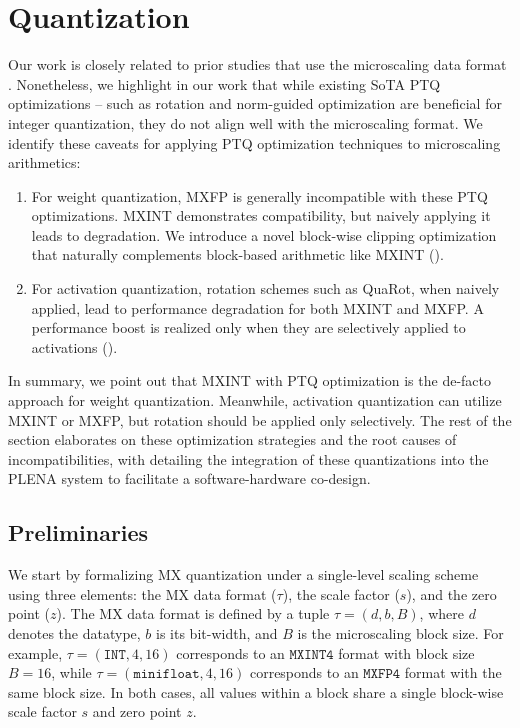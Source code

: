 \section{Quantization}
\label{sec:quantization}

Our work is closely related to prior studies that use the microscaling data format \cite{microscaling, Microscopiq}. Nonetheless, we highlight in our work that while existing SoTA PTQ optimizations -- such as rotation \cite{QuaRot} and norm-guided optimization \cite{frantar2022gptq} are beneficial for integer quantization, they do not align well with the microscaling format.
We identify these caveats for applying PTQ optimization techniques to microscaling arithmetics:

\begin{enumerate}
    \item For weight quantization, MXFP is generally incompatible with these PTQ optimizations. MXINT demonstrates compatibility, but naively applying it leads to degradation. We introduce a novel block-wise clipping optimization that naturally complements block-based arithmetic like MXINT ().
    \item For activation quantization, rotation schemes such as QuaRot, when naively applied, lead to performance degradation for both MXINT and MXFP. A performance boost is realized only when they are selectively applied to activations ().
\end{enumerate}

In summary, we point out that MXINT with PTQ optimization is the de-facto approach for weight quantization. Meanwhile, activation quantization can utilize MXINT or MXFP, but rotation should be applied only selectively. 
The rest of the section elaborates on these optimization strategies and the root causes of incompatibilities, with  detailing the integration of these quantizations into the PLENA system to facilitate a software-hardware co-design.


\subsection{Preliminaries}
We start by formalizing MX quantization under a single-level scaling scheme using three elements: the MX data format ($\tau$), the scale factor ($s$), and the zero point ($z$). The MX data format is defined by a tuple $\tau = (d, b, B)$, where $d$ denotes the datatype, $b$ is its bit-width, and $B$ is the microscaling block size. For example, $\tau = (\texttt{INT}, 4, 16)$ corresponds to an $\texttt{MXINT4}$ format with block size $B=16$, while $\tau = (\texttt{minifloat}, 4, 16)$ corresponds to an $\texttt{MXFP4}$ format with the same block size. In both cases, all values within a block share a single block-wise scale factor $s$ and zero point $z$.

